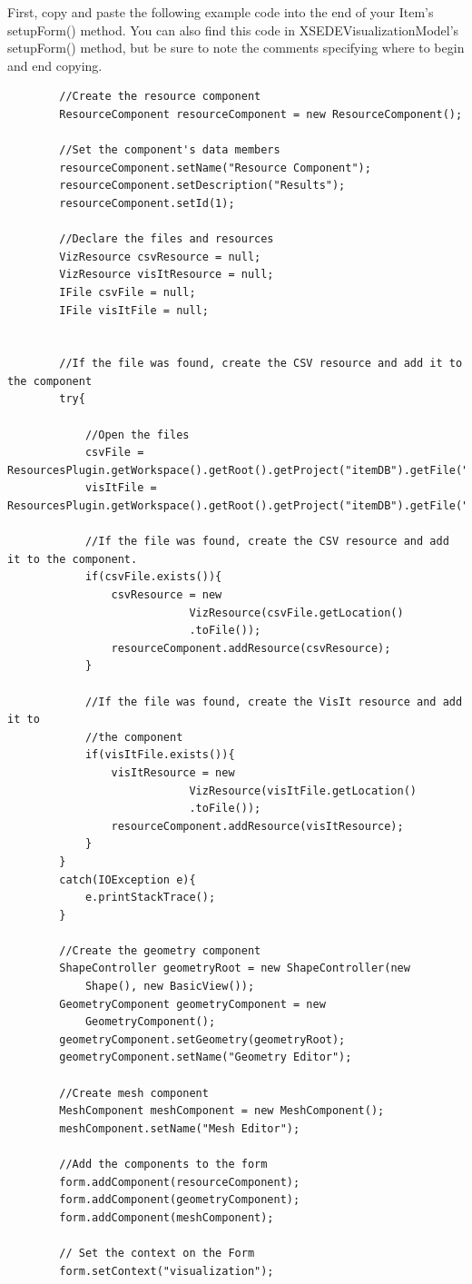 First, copy and paste the following example code into the end of your Item's
setupForm() method. You can also find this code in
XSEDEVisualizationModel's setupForm() method, but be sure to note the
comments specifying where to begin and end copying. 

{\small
\begin{verbatim}
		//Create the resource component
		ResourceComponent resourceComponent = new ResourceComponent();

		//Set the component's data members
		resourceComponent.setName("Resource Component");
		resourceComponent.setDescription("Results");
		resourceComponent.setId(1);

		//Declare the files and resources
		VizResource csvResource = null;
		VizResource visItResource = null;
		IFile csvFile = null;
		IFile visItFile = null;


		//If the file was found, create the CSV resource and add it to the component
		try{
			
			//Open the files
			csvFile = ResourcesPlugin.getWorkspace().getRoot().getProject("itemDB").getFile("fib8.csv");
			visItFile = ResourcesPlugin.getWorkspace().getRoot().getProject("itemDB").getFile("tire.silo");
			
			//If the file was found, create the CSV resource and add it to the component.
			if(csvFile.exists()){
				csvResource = new 
		                    VizResource(csvFile.getLocation()
		                    .toFile());
		    	resourceComponent.addResource(csvResource);
			}
				        
			//If the file was found, create the VisIt resource and add it to 
			//the component
			if(visItFile.exists()){
				visItResource = new 
		                    VizResource(visItFile.getLocation()
		                    .toFile());
				resourceComponent.addResource(visItResource);
			}
		}
		catch(IOException e){
			e.printStackTrace();
		}

		//Create the geometry component
		ShapeController geometryRoot = new ShapeController(new
		    Shape(), new BasicView());
		GeometryComponent geometryComponent = new 
		    GeometryComponent();
		geometryComponent.setGeometry(geometryRoot);
		geometryComponent.setName("Geometry Editor");

		//Create mesh component
		MeshComponent meshComponent = new MeshComponent();
		meshComponent.setName("Mesh Editor");

		//Add the components to the form
		form.addComponent(resourceComponent);
		form.addComponent(geometryComponent);
		form.addComponent(meshComponent);	
		
		// Set the context on the Form
		form.setContext("visualization");
\end{verbatim} 
}

